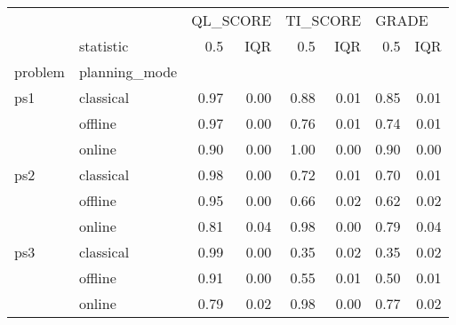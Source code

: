 \begin{tabular}{llrrrrrr}
\toprule
    & {} & \multicolumn{2}{l}{QL\_SCORE} & \multicolumn{2}{l}{TI\_SCORE} & \multicolumn{2}{l}{GRADE} \\
    & statistic &      0.5 &  IQR &      0.5 &  IQR &   0.5 &  IQR \\
problem & planning\_mode &          &      &          &      &       &      \\
\midrule
ps1 & classical &     0.97 & 0.00 &     0.88 & 0.01 &  0.85 & 0.01 \\
    & offline &     0.97 & 0.00 &     0.76 & 0.01 &  0.74 & 0.01 \\
    & online &     0.90 & 0.00 &     1.00 & 0.00 &  0.90 & 0.00 \\
ps2 & classical &     0.98 & 0.00 &     0.72 & 0.01 &  0.70 & 0.01 \\
    & offline &     0.95 & 0.00 &     0.66 & 0.02 &  0.62 & 0.02 \\
    & online &     0.81 & 0.04 &     0.98 & 0.00 &  0.79 & 0.04 \\
ps3 & classical &     0.99 & 0.00 &     0.35 & 0.02 &  0.35 & 0.02 \\
    & offline &     0.91 & 0.00 &     0.55 & 0.01 &  0.50 & 0.01 \\
    & online &     0.79 & 0.02 &     0.98 & 0.00 &  0.77 & 0.02 \\
\bottomrule
\end{tabular}
